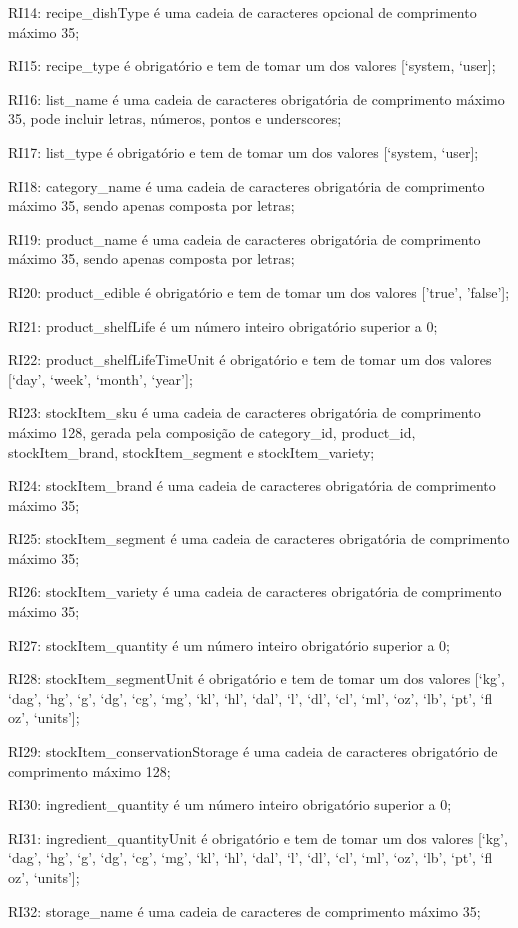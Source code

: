 \begin{description}
	\item RI14: recipe\_dishType é uma cadeia de caracteres opcional de comprimento máximo 35;
	\item RI15: recipe\_type é obrigatório e tem de tomar um dos valores [‘system, ‘user];
	\item RI16: list\_name é uma cadeia de caracteres obrigatória de comprimento máximo 35, pode incluir letras, números, pontos e underscores;
	\item RI17: list\_type é obrigatório e tem de tomar um dos valores [‘system, ‘user];
	\item RI18: category\_name é uma cadeia de caracteres obrigatória de comprimento máximo 35, sendo apenas composta por letras;
	\item RI19: product\_name é uma cadeia de caracteres obrigatória de comprimento máximo 35, sendo apenas composta por letras;
	\item RI20: product\_edible é obrigatório e tem de tomar um dos valores ['true', 'false'];
	\item RI21: product\_shelfLife é um número inteiro obrigatório superior a 0;
	\item RI22: product\_shelfLifeTimeUnit é obrigatório e tem de tomar um dos valores [‘day’, ‘week’, ‘month’, ‘year’];
	\item RI23: stockItem\_sku é uma cadeia de caracteres obrigatória de comprimento máximo 128, gerada pela composição de category\_id, product\_id, stockItem\_brand, stockItem\_segment e stockItem\_variety;
	\item RI24: stockItem\_brand é uma cadeia de caracteres obrigatória de comprimento máximo 35;
	\item RI25: stockItem\_segment é uma cadeia de caracteres obrigatória de comprimento máximo 35;
	\item RI26: stockItem\_variety é uma cadeia de caracteres obrigatória de comprimento máximo 35;
	\item RI27: stockItem\_quantity é um número inteiro obrigatório superior a 0;
	\item RI28: stockItem\_segmentUnit é obrigatório e tem de tomar um dos valores [‘kg’, ‘dag’, ‘hg’, ‘g’, ‘dg’, ‘cg’, ‘mg’, ‘kl’, ‘hl’, ‘dal’, ‘l’, ‘dl’, ‘cl’, ‘ml’, ‘oz’, ‘lb’, ‘pt’, ‘fl oz’, ‘units’];
	\item RI29: stockItem\_conservationStorage é uma cadeia de caracteres obrigatório de comprimento máximo 128;
	\item RI30: ingredient\_quantity é um número inteiro obrigatório superior a 0;
	\item RI31: ingredient\_quantityUnit é obrigatório e tem de tomar um dos valores [‘kg’, ‘dag’, ‘hg’, ‘g’, ‘dg’, ‘cg’, ‘mg’, ‘kl’, ‘hl’, ‘dal’, ‘l’, ‘dl’, ‘cl’, ‘ml’, ‘oz’, ‘lb’, ‘pt’, ‘fl oz’, ‘units’];
	\item RI32: storage\_name é uma cadeia de caracteres de comprimento máximo 35;
\end{description}


